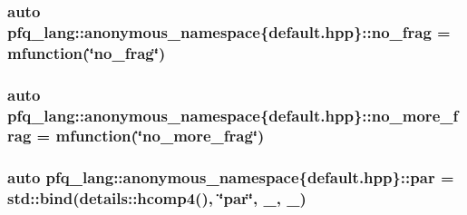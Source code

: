 \hypertarget{namespacepfq__lang_1_1anonymous__namespace_02default_8hpp_03_a60b130b2b5a08d0c83063ed584b79396}{
\subsubsection[{no\+\_\+frag}]{\setlength{\rightskip}{0pt plus 5cm}auto pfq\+\_\+lang\+::anonymous\+\_\+namespace\{default.\+hpp\}\+::no\+\_\+frag = {\bf mfunction}(\char`\"{}no\+\_\+frag\char`\"{})}}\label{namespacepfq__lang_1_1anonymous__namespace_02default_8hpp_03_a60b130b2b5a08d0c83063ed584b79396}
\hypertarget{namespacepfq__lang_1_1anonymous__namespace_02default_8hpp_03_ac400453f07ca5fc4ef28d20085f149c2}{
\subsubsection[{no\+\_\+more\+\_\+frag}]{\setlength{\rightskip}{0pt plus 5cm}auto pfq\+\_\+lang\+::anonymous\+\_\+namespace\{default.\+hpp\}\+::no\+\_\+more\+\_\+frag = {\bf mfunction}(\char`\"{}no\+\_\+more\+\_\+frag\char`\"{})}}\label{namespacepfq__lang_1_1anonymous__namespace_02default_8hpp_03_ac400453f07ca5fc4ef28d20085f149c2}
\hypertarget{namespacepfq__lang_1_1anonymous__namespace_02default_8hpp_03_aa991781009d861f536522cd68c317317}{
\subsubsection[{par}]{\setlength{\rightskip}{0pt plus 5cm}auto pfq\+\_\+lang\+::anonymous\+\_\+namespace\{default.\+hpp\}\+::par = std\+::bind(details\+::hcomp4(), \char`\"{}par\char`\"{}, \+\_, \+\_)}}\label{namespacepfq__lang_1_1anonymous__namespace_02default_8hpp_03_aa991781009d861f536522cd68c317317}
